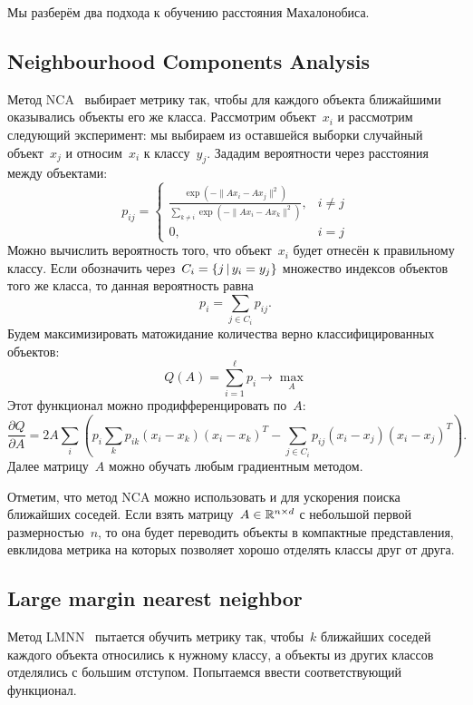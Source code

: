 \documentclass[12pt,fleqn]{article}
\begin{document}
Мы разберём два подхода к обучению расстояния Махалонобиса.

\subsection{Neighbourhood Components Analysis}

Метод NCA~\cite{goldberger05nca} выбирает метрику так, чтобы для каждого объекта
ближайшими оказывались объекты его же класса.
Рассмотрим объект~$x_i$ и рассмотрим следующий эксперимент:
мы выбираем из оставшейся выборки случайный объект~$x_j$ и относим~$x_i$ к классу~$y_j$.
Зададим вероятности через расстояния между объектами:
\[
    p_{ij}
    =
    \begin{cases}
        \frac{
            \exp(-\|Ax_i - Ax_j\|^2)
        }{
            \sum_{k \neq i} \exp(-\|Ax_i - Ax_k\|^2)
        },
        &i \neq j\\
        0, &i = j
    \end{cases}
\]
Можно вычислить вероятность того, что объект~$x_i$ будет отнесён к правильному классу.
Если обозначить через~$C_i = \{j \mspace{3mu}{|}\mspace{3mu} y_i = y_j\}$ множество индексов объектов того же класса,
то данная вероятность равна
\[
    p_i
    =
    \sum_{j \in C_i}
    p_{ij}.
\]
Будем максимизировать матожидание количества верно классифицированных объектов:
\[
    Q(A)
    =
    \sum_{i = 1}^{\ell} p_i
    \to
    \max_{A}
\]
Этот функционал можно продифференцировать по~$A$:
\[
    \frac{\partial Q}{\partial A}
    =
    2A
    \sum_{i} \left(
        p_i
        \sum_{k}
            p_{ik} (x_i - x_k) (x_i - x_k)^T
        -
        \sum_{j \in C_i}
            p_{ij} (x_i - x_j) (x_i - x_j)^T
    \right).
\]
Далее матрицу~$A$ можно обучать любым градиентным методом.

Отметим, что метод NCA можно использовать и для ускорения поиска ближайших соседей.
Если взять матрицу~$A \in \RR^{n \times d}$ с небольшой первой размерностью~$n$,
то она будет переводить объекты в компактные представления,
евклидова метрика на которых позволяет хорошо отделять классы друг от друга.

\subsection{Large margin nearest neighbor}

Метод LMNN~\cite{weinberger06lmnn} пытается обучить метрику так,
чтобы~$k$ ближайших соседей каждого объекта относились к нужному классу,
а объекты из других классов отделялись с большим отступом.
Попытаемся ввести соответствующий функционал.
\end{document}
